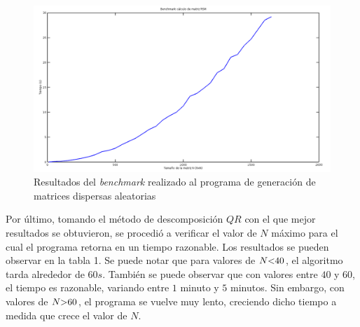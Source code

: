 \documentclass[spanish]{article}
\begin{document}
    
    \begin{figure}[H]
        \centering
        \includegraphics[scale=0.22]{./ben2.png}
        \caption{Resultados del \textit{benchmark} realizado al programa de generación de matrices dispersas aleatorias}
    \end{figure}
    
    
    \par Por último, tomando el método de descomposición $QR$ con el que mejor resultados se obtuvieron, se procedió a verificar el valor de $N$ máximo para el cual el programa retorna en un tiempo razonable. Los resultados se pueden observar en la tabla 1. Se puede notar que para valores de $N \text{\textless} 40$, el algoritmo tarda alrededor de $60 s$. También se puede observar que con valores entre $40$ y $60$, el tiempo es razonable, variando entre $1$ minuto y $5$ minutos. Sin embargo, con valores de $N \text{\textgreater} 60$, el programa se vuelve muy lento, creciendo dicho tiempo a medida que crece el valor de $N$.
    
\end{document}
